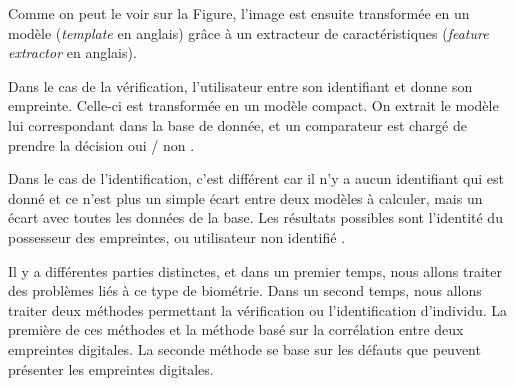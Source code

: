 Comme on peut le voir sur la Figure, l'image est ensuite transformée
en un modèle (\emph{template} en anglais) grâce à un extracteur de
caractéristiques (\emph{feature extractor} en anglais).

Dans le cas de la vérification, l'utilisateur entre son identifiant et
donne son empreinte. Celle-ci est transformée en un modèle compact.
On extrait le modèle lui correspondant dans la base de donnée, et un
comparateur est chargé de prendre la décision \og oui / non \fg.

Dans le cas de l'identification, c'est différent car il n'y a aucun
identifiant qui est donné et ce n'est plus un simple écart entre deux
modèles à calculer, mais un écart avec toutes les données de la base.
Les résultats possibles sont l'identité du possesseur des empreintes,
ou \og utilisateur non identifié \fg.

Il y a différentes parties distinctes, et dans un premier temps, nous
allons traiter des problèmes liés à ce type de biométrie. Dans un
second temps, nous allons traiter deux méthodes permettant la
vérification ou l'identification d'individu. La première de ces
méthodes et la méthode basé sur la corrélation entre deux empreintes
digitales. La seconde méthode se base sur les défauts que peuvent
présenter les empreintes digitales.


